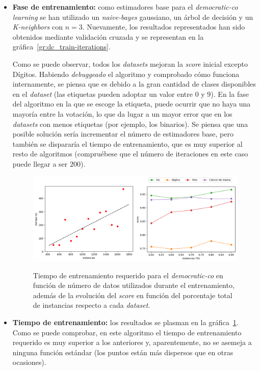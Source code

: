 \begin{itemize}
	\item \textbf{Fase de entrenamiento:} como estimadores base para el \textit{democratic-co learning} se han utilizado un \textit{naive-bayes} gaussiano, un árbol de decisión y un \textit{K-neighbors} con $n = 3$. Nuevamente, los resultados representados han sido obtenidos mediante validación cruzada y se representan en la gráfica~\ref{gr:dc_train-iterations}.
	
	Como se puede observar, todos los \textit{datasets} mejoran la \textit{score} inicial excepto Dígitos. Habiendo \textit{debuggeado} el algoritmo y comprobado cómo funciona internamente, se piensa que es debido a la gran cantidad de clases disponibles en el \textit{dataset} (las etiquetas pueden adoptar un valor entre $0$ y $9$). En la fase del algoritmo en la que se escoge la etiqueta, puede ocurrir que no haya una mayoría entre la votación, lo que da lugar a un mayor error que en los \textit{datasets} con menos etiquetas (por ejemplo, los binarios). Se piensa que una posible solución sería incrementar el número de estimadores base, pero también se dispararía el tiempo de entrenamiento, que es muy superior al resto de algoritmos (compruébese que el número de iteraciones en este caso puede llegar a ser $200$).
	
\begin{figure}[h]
	\caption[\textit{Democratic-co}: resultados experimentación (tiempo-porcentaje)]{Tiempo de entrenamiento requerido para el \textit{democratic-co} en función de número de datos utilizados durante el entrenamiento, además de la evolución del \textit{score} en función del porcentaje total de instancias respecto a cada \textit{dataset}.}
	\centering
	\includegraphics[scale=0.4]{../img/memoria/5_democraticco_time-percentage}
	\label{gr:dc_time-percentage}
\end{figure}
	
	\item \textbf{Tiempo de entrenamiento:} los resultados se plasman en la gráfica~\ref{gr:dc_time-percentage}. Como se puede comprobar, en este algoritmo el tiempo de entrenamiento requerido es muy superior a los anteriores y, aparentemente, no se asemeja a ninguna función estándar (los puntos están más dispersos que en otras ocasiones).
	

\end{itemize}
